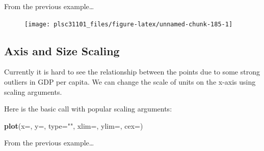 \documentclass[
]{book}
\newenvironment{Shaded}{\begin{snugshade}}{\end{snugshade}}
\newcommand{\CommentTok}[1]{\textcolor[rgb]{0.56,0.35,0.01}{\textit{#1}}}
\newcommand{\DataTypeTok}[1]{\textcolor[rgb]{0.13,0.29,0.53}{#1}}
\newcommand{\KeywordTok}[1]{\textcolor[rgb]{0.13,0.29,0.53}{\textbf{#1}}}
\newcommand{\NormalTok}[1]{#1}
\newcommand{\OperatorTok}[1]{\textcolor[rgb]{0.81,0.36,0.00}{\textbf{#1}}}
\newcommand{\StringTok}[1]{\textcolor[rgb]{0.31,0.60,0.02}{#1}}
\begin{document}
From the previous example\ldots{}

\begin{Shaded}
\end{Shaded}

\begin{figure}

{\centering \texttt{[image: plsc31101\_files/figure-latex/unnamed-chunk-185-1]} 

}

\caption{ }\label{fig:unnamed-chunk-185}
\end{figure}

\hypertarget{axis-and-size-scaling}{%
\subsection{Axis and Size Scaling}\label{axis-and-size-scaling}}

Currently it is hard to see the relationship between the points due to some strong outliers in GDP per capita. We can change the scale of units on the x-axis using scaling arguments.

Here is the basic call with popular scaling arguments:

\begin{Shaded}
\begin{Highlighting}[]
\KeywordTok{plot}\NormalTok{(}\DataTypeTok{x=}\NormalTok{, }\DataTypeTok{y=}\NormalTok{, }\DataTypeTok{type=}\StringTok{""}\NormalTok{, }\DataTypeTok{xlim=}\NormalTok{, }\DataTypeTok{ylim=}\NormalTok{, }\DataTypeTok{cex=}\NormalTok{)}
\end{Highlighting}
\end{Shaded}

From the previous example\ldots{}
\end{document}
